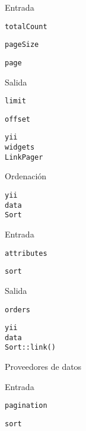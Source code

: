 \begin{longenum}
\begin{longenum}
\begin{longenum}
            \item Entrada
            \begin{longenum}
                \item \texttt{totalCount}
                \item \texttt{pageSize}
                \item \texttt{page}
            \end{longenum}
            \item Salida
            \begin{longenum}
                \item \texttt{limit}
                \item \texttt{offset}
            \end{longenum}
            \item \texttt{yii\\widgets\\LinkPager}
        \end{longenum}
        \item Ordenación
        \begin{longenum}
            \item \texttt{yii\\data\\Sort}
            \item Entrada
            \begin{longenum}
                \item \texttt{attributes}
                \item \texttt{sort}
            \end{longenum}
            \item Salida
            \begin{longenum}
                \item \texttt{orders}
            \end{longenum}
            \item \texttt{yii\\data\\Sort::link()}
        \end{longenum}
        \item Proveedores de datos
        \begin{longenum}
            \item Entrada
            \begin{longenum}
                \item \texttt{pagination}
                \item \texttt{sort}

\end{longenum}
\end{longenum}
\end{longenum}
\end{longenum}

